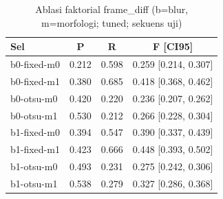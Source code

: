 \begin{table}[t]
\centering
\caption{Ablasi faktorial frame\_diff (b=blur, m=morfologi; tuned; sekuens uji)}
\label{tab:table_ablation_cells_frame_diff}
\begin{tabular}{lccc}
\toprule
Sel & P & R & F [CI95] \\
\midrule
b0-fixed-m0 & 0.212 & 0.598 & 0.259 [0.214, 0.307] \\
b0-fixed-m1 & 0.380 & 0.685 & 0.418 [0.368, 0.462] \\
b0-otsu-m0 & 0.420 & 0.220 & 0.236 [0.207, 0.262] \\
b0-otsu-m1 & 0.530 & 0.212 & 0.266 [0.228, 0.304] \\
b1-fixed-m0 & 0.394 & 0.547 & 0.390 [0.337, 0.439] \\
b1-fixed-m1 & 0.423 & 0.666 & 0.448 [0.393, 0.502] \\
b1-otsu-m0 & 0.493 & 0.231 & 0.275 [0.242, 0.306] \\
b1-otsu-m1 & 0.538 & 0.279 & 0.327 [0.286, 0.368] \\
\bottomrule
\end{tabular}
\end{table}
